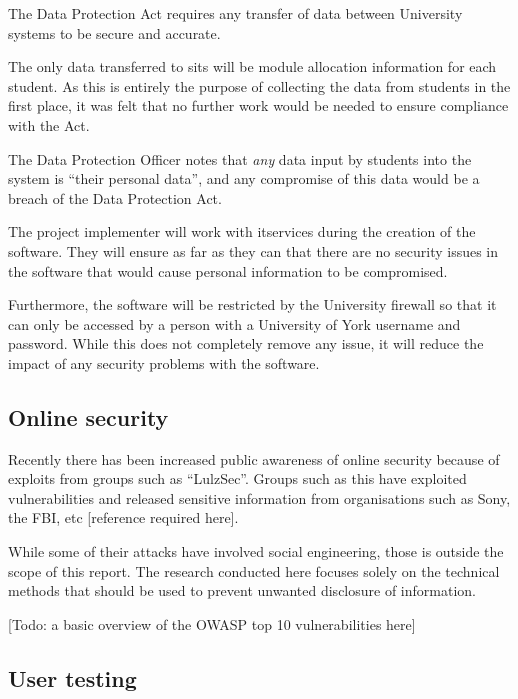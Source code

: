 \documentclass[draft]{scrartcl}
\begin{document}

The Data Protection Act requires any transfer of data between University
systems to be secure and accurate.

The only data transferred to \gls{sits} will be module allocation information
for each student. As this is entirely the purpose of collecting the data from
students in the first place, it was felt that no further work would be needed
to ensure compliance with the Act.


The Data Protection Officer notes that \emph{any} data input by students into the
system is ``their personal data'', and any compromise of this data would be a
breach of the Data Protection Act.

The project implementer will work with \gls{itservices} during the creation of
the software. They will ensure as far as they can that there are no security
issues in the software that would cause personal information to be compromised.

Furthermore, the software will be restricted by the University firewall so
that it can only be accessed by a person with a University of York username
and password. While this does not completely remove any issue, it will reduce
the impact of any security problems with the software.

\subsection{Online security}

Recently there has been increased public awareness of online security because
of exploits from groups such as ``LulzSec''. Groups such as this have
exploited vulnerabilities and released sensitive information from
organisations such as Sony, the FBI, etc [reference required here].

While some of their attacks have involved social engineering, those is outside
the scope of this report. The research conducted here focuses solely on the
technical methods that should be used to prevent unwanted disclosure of
information.

[Todo: a basic overview of the OWASP top 10 vulnerabilities here]

\subsection{User testing}
\end{document}
